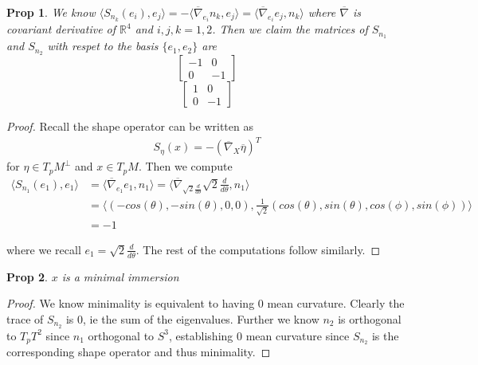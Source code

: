 \documentclass[11pt]{article}
\newcommand{\R}{\mathbb{R}}
\newtheorem{prop}{Prop}
\begin{document}
\begin{prop}
	We know $\langle S_{n_k}(e_i),e_j \rangle = -\langle \overline{\nabla}_{e_i} n_k,e_j\rangle = \langle \overline{\nabla}_{e_i} e_j, n_k\rangle$ where $\overline{\nabla}$ is covariant derivative of $\R^4$ and $i,j,k = 1,2$. Then we claim the matrices of $S_{n_1}$ and $S_{n_2}$ with respet to the basis $\{e_1,e_2\}$ are
	\[
		\begin{bmatrix}
			-1 & 0\\
			0 & -1
		\end{bmatrix}
	\]
	\[
		\begin{bmatrix}
			1 & 0\\
			0 & -1
		\end{bmatrix}
	\]
\end{prop}

\begin{proof}
	Recall the shape operator can be written as 
	\begin{align*}
		S_{\eta}(x) = -(\overline{\nabla}_X \overline{\eta})^T
	\end{align*}
	for $\eta \in T_pM^{\perp}$ and $x \in T_pM$. Then we compute
	\begin{align*}
		\langle S_{n_1}(e_1),e_1\rangle &= \langle \overline{\nabla}_{e_1}e_1,n_1\rangle = \langle \overline{\nabla}_{\sqrt{2}\frac{d}{d\theta}} \sqrt{2}\frac{d}{d\theta},n_1 \rangle \\
		&= \langle (-cos(\theta),-sin(\theta),0,0), \frac{1}{\sqrt{2}}(cos(\theta),sin(\theta),cos(\phi),sin(\phi))\rangle \\
		&= -1
	\end{align*}
	
	where we recall $e_1 = \sqrt{2}\frac{d}{d\theta}$. The rest of the computations follow similarly.

\end{proof}


\begin{prop}
	$x$ is a minimal immersion
\end{prop}

\begin{proof}
	We know minimality is equivalent to having 0 mean curvature. Clearly the trace of $S_{n_2}$ is 0, ie the sum of the eigenvalues. Further we know $n_2$ is orthogonal to $T_pT^2$ since $n_1$ orthogonal to $S^3$, establishing 0 mean curvature since $S_{n_2}$ is the corresponding shape operator and thus minimality. 
\end{proof}
\end{document}
